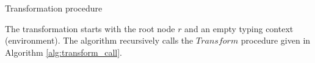 \begin{algorithm}[ht]
\caption{Transformation procedure}
\label{alg:transformation}
\begin{algorithmic}[1]


 


\end{algorithmic}
\end{algorithm}

The transformation starts with the root node $r$ and an empty typing context
(environment).
The algorithm recursively calls the $Transform$ procedure given in Algorithm
\ref{alg:transform_call}.


